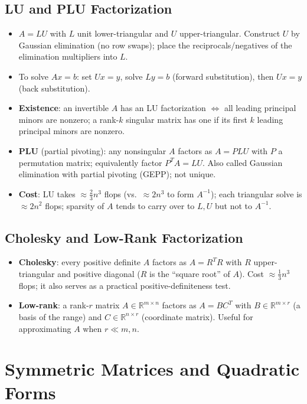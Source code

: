 \documentclass[hidelinks]{article}
\begin{document}
\subsection{LU and PLU Factorization}
\begin{itemize}
    \item $A = LU$ with $L$ unit lower-triangular and $U$ upper-triangular. Construct $U$ by Gaussian elimination (no row swaps); place the reciprocals/negatives of the elimination multipliers into $L$.
    \item To solve $Ax=b$: set $Ux = y$, solve $Ly = b$ (forward substitution), then $Ux = y$ (back substitution).
    \item \textbf{Existence}: an invertible $A$ has an LU factorization $\iff$ all leading principal minors are nonzero; a rank-$k$ singular matrix has one if its first $k$ leading principal minors are nonzero.
    \item \textbf{PLU} (partial pivoting): any nonsingular $A$ factors as $A = PLU$ with $P$ a permutation matrix; equivalently factor $P^TA = LU$. Also called Gaussian elimination with partial pivoting (GEPP); not unique.
    \item \textbf{Cost}: LU takes $\approx \tfrac{2}{3}n^3$ flops (vs.\ $\approx 2n^3$ to form $A^{-1}$); each triangular solve is $\approx 2n^2$ flops; sparsity of $A$ tends to carry over to $L,U$ but not to $A^{-1}$.
\end{itemize}

\subsection{Cholesky and Low-Rank Factorization}
\begin{itemize}
    \item \textbf{Cholesky}: every positive definite $A$ factors as $A = R^TR$ with $R$ upper-triangular and positive diagonal ($R$ is the ``square root'' of $A$). Cost $\approx \tfrac{1}{3}n^3$ flops; it also serves as a practical positive-definiteness test.
    \item \textbf{Low-rank}: a rank-$r$ matrix $A\in\mathbb{R}^{m\times n}$ factors as $A = BC^T$ with $B\in\mathbb{R}^{m\times r}$ (a basis of the range) and $C\in\mathbb{R}^{n\times r}$ (coordinate matrix). Useful for approximating $A$ when $r\ll m,n$.
\end{itemize}

\section{Symmetric Matrices and Quadratic Forms}
\end{document}
